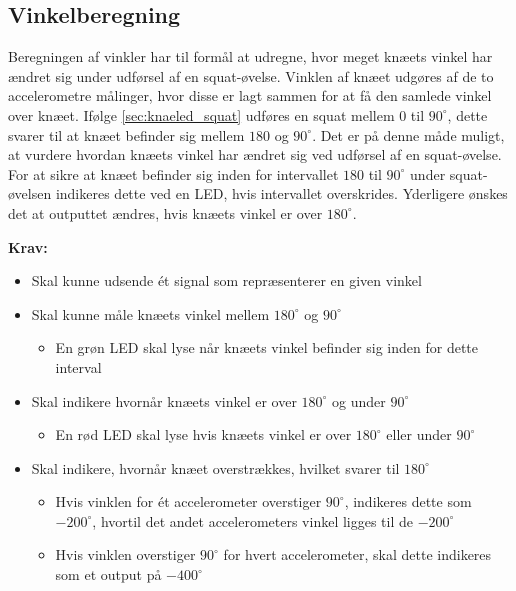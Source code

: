 \subsection{Vinkelberegning}
Beregningen af vinkler har til formål at udregne, hvor meget knæets vinkel  har ændret sig under udførsel af en squat-øvelse. Vinklen af knæet udgøres af de to accelerometre målinger, hvor disse er lagt sammen for at få den samlede vinkel over knæet.
Ifølge \autoref{sec:knaeled_squat} udføres en squat mellem $0$ til $90^{\circ}$, dette svarer til at knæet befinder sig mellem $180$ og $90^{\circ}$. Det er på denne måde muligt, at vurdere hvordan knæets vinkel har ændret sig ved udførsel af en squat-øvelse. 
For at sikre at knæet befinder sig inden for intervallet $180$ til $90^{\circ}$ under squat-øvelsen indikeres dette ved en LED, hvis intervallet overskrides. Yderligere ønskes det at outputtet ændres, hvis knæets vinkel er  over $180^{\circ}$.

 
\vspace{3mm}
\textbf{Krav:}
\begin{itemize}
\item Skal kunne udsende ét signal som repræsenterer en given vinkel
\item Skal kunne måle knæets vinkel mellem $180^{\circ}$ og $90^{\circ}$
\begin{itemize}
\item En grøn LED skal lyse når knæets vinkel befinder sig inden for dette interval
\end{itemize}
\item Skal indikere hvornår knæets vinkel er over $180^{\circ}$ og under $90^{\circ}$
\begin{itemize}
\item En rød LED skal lyse hvis knæets vinkel er over $180^{\circ}$ eller under $90^{\circ}$
\end{itemize}
\item Skal indikere, hvornår knæet overstrækkes, hvilket svarer til $180^{\circ}$
\begin{itemize}
\item Hvis vinklen for ét accelerometer overstiger $90^{\circ}$, indikeres dette som $-200^{\circ}$, hvortil det andet accelerometers vinkel ligges til de $-200^{\circ}$
\item Hvis vinklen overstiger $90^{\circ}$ for hvert accelerometer, skal dette indikeres som et output på $-400^{\circ}$
\end{itemize}
\end{itemize}